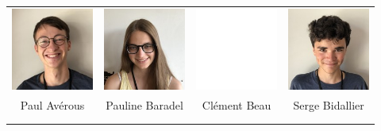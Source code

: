 

\vspace{2mm}
\begin{center}
\begin{tabular}{cccc}
\includegraphics[angle=270,origin=c, width=27mm]{eleves/Averous Paul.JPG} &
\includegraphics[angle=270,origin=c, width=27mm]{eleves/Baradel Pauline.JPG} &
\includegraphics[angle=270,origin=c, width=27mm]{vide.JPG} &
\includegraphics[angle=270,origin=c, width=27mm]{eleves/Bidallier Serge.JPG} \\
Paul Avérous & Pauline Baradel & Clément Beau & Serge Bidallier \\ \\ \\


\end{tabular}
\end{center}
